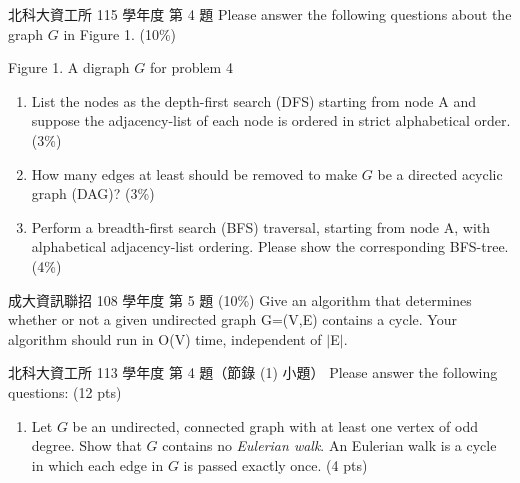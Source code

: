 \begin{pastexam}[label={px:gtr-3}]{北科大資工所 115 學年度 第 4 題}
Please answer the following questions about the graph $G$ in Figure 1. (10\%)
\begin{center}

Figure 1. A digraph $G$ for problem 4
\end{center}
\begin{enumerate}[label=(\arabic*)]
\item List the nodes as the depth-first search (DFS) starting from node A and suppose the adjacency-list of each node is ordered in strict alphabetical order. (3\%)
\item How many edges at least should be removed to make $G$ be a directed acyclic graph (DAG)? (3\%)
\item Perform a breadth-first search (BFS) traversal, starting from node A, with alphabetical adjacency-list ordering. Please show the corresponding BFS-tree. (4\%)
\end{enumerate}
\end{pastexam}

\begin{pastexam}[label={px:gtr-4}]{成大資訊聯招 108 學年度 第 5 題}
(10\%) Give an algorithm that determines whether or not a given undirected graph G=(V,E) contains a cycle. Your algorithm should run in O(V) time, independent of $|$E$|$.
\end{pastexam}

\begin{pastexam}[label={px:gtr-5}]{北科大資工所 113 學年度 第 4 題（節錄 (1) 小題）}
Please answer the following questions: (12 pts)
\begin{enumerate}[label=(\arabic*)]
\item Let $G$ be an undirected, connected graph with at least one vertex of odd degree. Show that $G$ contains no \textit{Eulerian walk}. An Eulerian walk is a cycle in which each edge in $G$ is passed exactly once. (4 pts)
\end{enumerate}
\end{pastexam}


